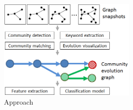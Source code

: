 \documentclass{article} %
\begin{document}
\begin{figure}\label{architecture}
   	\begin{center}
   	\includegraphics[width=0.6\textwidth]{architecture.png}
   	\end{center}
   	\caption{Approach}
\end{figure}
\end{document}
